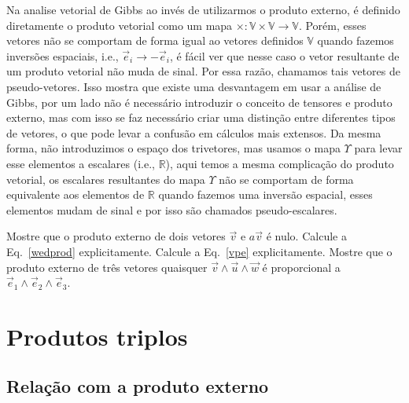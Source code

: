 Na analise vetorial de Gibbs ao invés de utilizarmos o produto externo, é
definido diretamente o produto vetorial como um mapa
$\times:\mathbb{V}\times\mathbb{V}\to\mathbb{V}$. Porém, esses vetores não se
comportam de forma igual ao vetores definidos $\mathbb{V}$ quando fazemos
inversões espaciais, i.e., $\vec{e}_i \to -\vec{e}_i$, é fácil ver que nesse
caso o vetor resultante de um produto vetorial não muda de sinal. Por essa
razão, chamamos tais vetores de pseudo-vetores. Isso mostra que existe uma
desvantagem em usar a análise de Gibbs, por um lado não é necessário introduzir
o conceito de tensores e produto externo, mas com isso se faz necessário criar
uma distinção entre diferentes tipos de vetores, o que pode levar a confusão em
cálculos mais extensos. Da mesma forma, não introduzimos o espaço dos
trivetores, mas usamos o mapa $\Upsilon$ para levar esse elementos a escalares
(i.e., $\mathbb{R}$), aqui temos a mesma complicação do produto vetorial, os
escalares resultantes do mapa $\Upsilon$ não se comportam de forma equivalente
aos elementos de $\mathbb{R}$ quando fazemos uma inversão espacial, esses
elementos mudam de sinal e por isso são chamados pseudo-escalares.

\begin{Exercise}[title={Produto vetorial}]
	\Question Mostre que o produto externo de dois vetores $\vec{v}$ e $a\vec{v}$ é nulo.
	\Question[difficulty=1] Calcule a Eq.~\eqref{wedprod} explicitamente.
	\Question Calcule a Eq.~\eqref{vpe} explicitamente.
	\Question Mostre que o produto externo de três vetores quaisquer $\vec{v}\wedge\vec{u}\wedge\vec{w}$ é proporcional a $\vec{e}_1\wedge\vec{e}_2\wedge\vec{e}_3$.
\end{Exercise}

\section{Produtos triplos}

\subsection{Relação com a produto externo}
\label{sec:trip}

